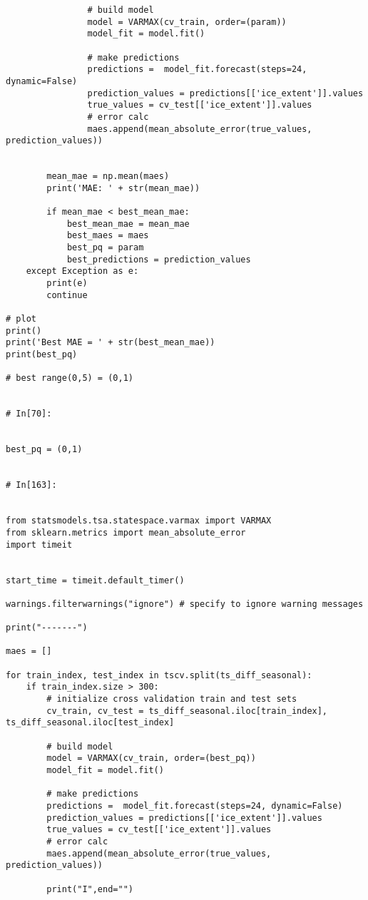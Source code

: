 \begin{verbatim}
                # build model
                model = VARMAX(cv_train, order=(param))
                model_fit = model.fit()

                # make predictions
                predictions =  model_fit.forecast(steps=24, dynamic=False)
                prediction_values = predictions[['ice_extent']].values
                true_values = cv_test[['ice_extent']].values
                # error calc
                maes.append(mean_absolute_error(true_values, prediction_values))

        
        mean_mae = np.mean(maes)
        print('MAE: ' + str(mean_mae))    

        if mean_mae < best_mean_mae:
            best_mean_mae = mean_mae
            best_maes = maes
            best_pq = param
            best_predictions = prediction_values
    except Exception as e:
        print(e)
        continue
   
# plot
print()
print('Best MAE = ' + str(best_mean_mae))
print(best_pq)

# best range(0,5) = (0,1)


# In[70]:


best_pq = (0,1)


# In[163]:


from statsmodels.tsa.statespace.varmax import VARMAX
from sklearn.metrics import mean_absolute_error
import timeit


start_time = timeit.default_timer()

warnings.filterwarnings("ignore") # specify to ignore warning messages

print("-------")

maes = []

for train_index, test_index in tscv.split(ts_diff_seasonal):
    if train_index.size > 300:
        # initialize cross validation train and test sets
        cv_train, cv_test = ts_diff_seasonal.iloc[train_index], ts_diff_seasonal.iloc[test_index]

        # build model
        model = VARMAX(cv_train, order=(best_pq))
        model_fit = model.fit()

        # make predictions
        predictions =  model_fit.forecast(steps=24, dynamic=False)
        prediction_values = predictions[['ice_extent']].values
        true_values = cv_test[['ice_extent']].values
        # error calc
        maes.append(mean_absolute_error(true_values, prediction_values))

        print("I",end="")
    


\end{verbatim}
